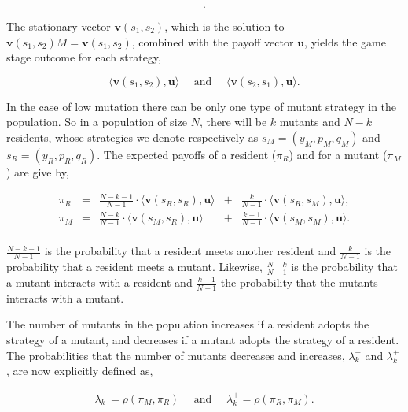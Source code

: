 \documentclass[11pt]{article}
\theoremstyle{plainCl1}
\theoremstyle{plainCl2}
\begin{document}
\begin{equation}\label{eq:transition_matrix}
  .
\end{equation}

The stationary vector \(\mathbf{v}(s_1,s_2)\),
which is the solution to \(\mathbf{v}(s_1,s_2) M = \mathbf{v}(s_1,s_2)\), combined with the payoff vector
\(\mathbf{u}\), yields the game stage outcome for each strategy,

\[\langle\mathbf{v}(s_1,s_2),\mathbf{u}\rangle \quad  \text{ and } \quad  \langle\mathbf{v}(s_2,s_1), \mathbf{u}\rangle.\]

In the case of low mutation there can be only one type of mutant strategy in the
population. So in a population of size \(N\), there will be \(k\) mutants and
\(N - k\) residents, whose strategies we denote respectively as \(s_M =(y_M,
p_M, q_M)\) and \(s_R = (y_R, p_R, q_R)\).
The expected payoffs of a resident (\(\pi_R\)) and for a
mutant (\(\pi_M\)) are give by,

\begin{equation} \label{Eq:ExpPay}
  \begin{array}{lcrcr}
  \displaystyle \pi_R & = &\displaystyle \frac{N\!-\!k\!-\!1}{N-1}\cdot \langle\mathbf{v}(s_R,s_R),\mathbf{u}\rangle	&+	&\displaystyle\frac{k}{N-1}\cdot \langle\mathbf{v}(s_R,s_M),\mathbf{u}\rangle,\\[0.5cm]
  \displaystyle \pi_M & = &\displaystyle\frac{N-k}{N-1}\cdot \langle\mathbf{v}(s_M,s_R),\mathbf{u}\rangle&+	&\displaystyle\frac{k-1}{N-1}\cdot \langle\mathbf{v}(s_M,s_M),\mathbf{u}\rangle.\\
  \end{array}
\end{equation}

\(\frac{N\!-\!k\!-\!1}{N-1}\) is the probability that a resident meets another
resident and \(\frac{k}{N-1}\) is the probability that a resident meets a
mutant. Likewise, \(\frac{N-k}{N-1}\) is the probability that a mutant interacts
with a resident and \(\frac{k-1}{N-1}\) the probability that the mutants
interacts with a mutant.

The number of mutants in the population increases if a resident adopts the strategy
of a mutant, and decreases if a mutant adopts the strategy of a resident. The
probabilities that the number of mutants decreases and increases,
\(\lambda^-_k\) and \(\lambda^+_k\), are now explicitly defined as,

\begin{align*}
  \lambda^-_k \!=\!\rho(\pi_M, \pi_R) \quad \text{ and } \quad \lambda^+_k \!=\!\rho(\pi_R, \pi_M).
\end{align*}
\end{document}
